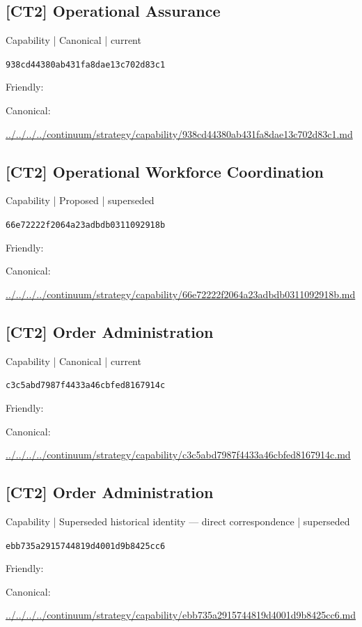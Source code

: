 \documentclass[10pt,a4paper]{article}
\begin{document}
\subsection*{[CT2] Operational Assurance}
{\small Capability | Canonical | current}\par
\texttt{938cd44380ab431fa8dae13c702d83c1}\par
Friendly: \par
Canonical: \par
{\footnotesize\url{../../../../continuum/strategy/capability/938cd44380ab431fa8dae13c702d83c1.md}}\par
\subsection*{[CT2] Operational Workforce Coordination}
{\small Capability | Proposed | superseded}\par
\texttt{66e72222f2064a23adbdb0311092918b}\par
Friendly: \par
Canonical: \par
{\footnotesize\url{../../../../continuum/strategy/capability/66e72222f2064a23adbdb0311092918b.md}}\par
\subsection*{[CT2] Order Administration}
{\small Capability | Canonical | current}\par
\texttt{c3c5abd7987f4433a46cbfed8167914c}\par
Friendly: \par
Canonical: \par
{\footnotesize\url{../../../../continuum/strategy/capability/c3c5abd7987f4433a46cbfed8167914c.md}}\par
\subsection*{[CT2] Order Administration}
{\small Capability | Superseded historical identity — direct correspondence | superseded}\par
\texttt{ebb735a2915744819d4001d9b8425cc6}\par
Friendly: \par
Canonical: \par
{\footnotesize\url{../../../../continuum/strategy/capability/ebb735a2915744819d4001d9b8425cc6.md}}\par
\end{document}
